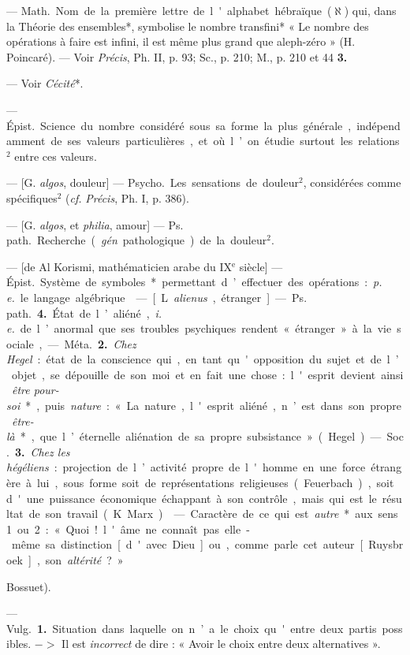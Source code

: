 \begin{itemize}[leftmargin=1cm, label=, itemsep=1pt]
{ — \si{Math.} Nom de la première
lettre de l'alphabet hébraïque ($\aleph$)
qui, dans la Théorie des ensembles*,
symbolise le nombre transfini*
« Le nombre des opérations à faire
est infini, il est même plus grand
que aleph-zéro » (H. Poincaré). —
Voir {\it Précis}, Ph. II, p. 93; Sc., p. 210;
M., p. 210 et 44 {\bf 3.}

 — Voir {\it Cécité}*.

 — \si{Épist.} Science du nombre
considéré sous sa forme la plus générale, indépendamment de ses valeurs
particulières, et où l’on étudie surtout les relations$^2$ entre ces valeurs.

 — [G. {\it algos}, douleur] — \si{Psycho.} Les sensations de
douleur$^2$, considérées comme spécifiques$^2$ ({\it cf.}  {\it Précis}, Ph. I, p. 386).

 — [G. {\it algos}, et {\it philia}, amour]
— \si{Ps. path.} Recherche ({\it gén}. pathologique) de la douleur$^2$.

 — [de Al Korismi, mathématicien arabe du {\footnotesize IX}$^\text{e}$ siècle] — \si{Épist.}
Système de symboles* permettant
d’effectuer des opérations : {\it p. e.} le
langage algébrique.

 — [L. {\it alienus}, étranger] —
\si{Ps. path.} {\bf 4.} État de l’aliéné, {\it i. e.} de
l’anormal que ses troubles psychiques rendent « étranger » à la
vie sociale,

— \si{Méta.} {\bf 2.} {\it Chez Hegel} : état de la
conscience qui, en tant qu'opposition du sujet et de l’objet,
se dépouille de son moi et en fait une
chose: l'esprit devient ainsi {\it être
pour-soi}*, puis {\it nature} : « La nature,
l'esprit aliéné, n’est dans son propre
{\it être-là}*, que l’éternelle aliénation de
sa propre subsistance » (Hegel).

— \si{Soc.} {\bf 3.} {\it Chez les hégéliens} : projection de l’activité propre de l'homme
en une force étrangère à lui, sous
forme soit de représentations religieuses (Feuerbach), soit d'une
puissance économique échappant à
son contrôle, mais qui est le résultat
de son travail (K. Marx).

 — Caractère de ce qui est
{\it autre}* aux sens 1 ou 2 : « Quoi!
l'âme ne connaît pas elle-même sa
distinction [d'avec Dieu] ou, comme
parle cet auteur [Ruysbroek], son
{\it altérité} ? » {Bossuet).

 — \si{Vulg.} {\bf 1.} Situation
dans laquelle on n’a le choix qu'entre
deux partis possibles. $->$ Il est
{\it incorrect} de dire : « Avoir le choix
entre deux alternatives ».

}}
\end{itemize}
